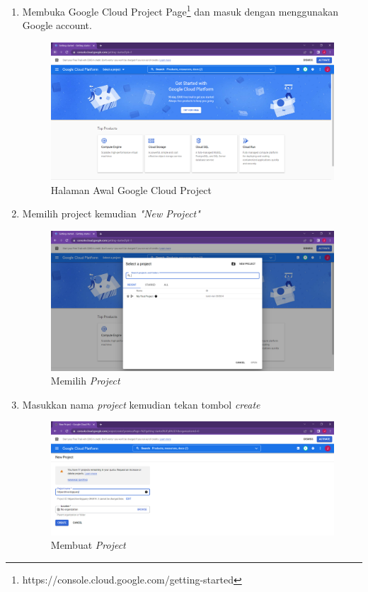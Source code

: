 \begin{enumerate}
	\item Membuka Google Cloud Project Page\footnote{https://console.cloud.google.com/getting-started} dan masuk dengan menggunakan Google account.
	\begin{figure}[H]
		\centering  
		\includegraphics[scale=0.35]{Gambar/Google BigQuery HomePage.PNG}  
		\caption{Halaman Awal Google Cloud Project} 
		\label{fig:GCP_HP} 
	\end{figure}
	
	\item Memilih project kemudian \textit{"New Project"}
	\begin{figure}[H]
		\centering  
		\includegraphics[scale=0.35]{Gambar/create_new_project.PNG}  
		\caption{Memilih \textit{Project}} 
		\label{fig:select_project} 
	\end{figure}
	
	\item Masukkan nama \textit{project} kemudian tekan tombol \textit{create}
	\begin{figure}[H]
		\centering  
		\includegraphics[scale=0.45]{Gambar/create_project.PNG}  
		\caption{Membuat \textit{Project}} 
		\label{fig:create_project} 
	\end{figure}
	

\end{enumerate}
